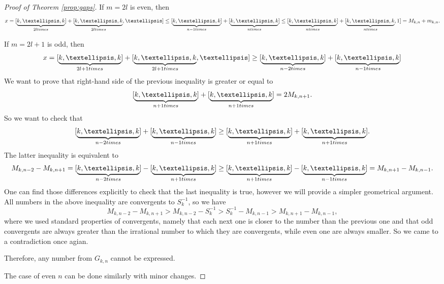\documentclass{amsart}
\theoremstyle{definition}
\newtheorem{conjecture}[theorem]{Conjecture}
\newcommand{\0}{\mbf 0}%
\renewcommand{\text}{\textup}
\begin{document}
\begin{proof}[Proof of Theorem \ref{prop:gaps}]
If $m=2l$ is even, then
$$
x = [\underbrace{k,\ldots,k}_{2l \text{ times }}] + [\underbrace{k,\ldots,k}_{2l \text{ times }},\ldots] \leq [\underbrace{k,\ldots,k}_{n-1 \text{ times }}] + [\underbrace{k,\ldots,k}_{n \text{ times }}] \leq [\underbrace{k,\ldots,k}_{n \text{ times }}] + [\underbrace{k,\ldots,k}_{n \text{ times }},1] = M_{k,n}+m_{k,n}.
$$

If $m=2l+1$ is odd, then 
$$
x = [\underbrace{k,\ldots,k}_{2l+1 \text{ times }}] + [\underbrace{k,\ldots,k}_{2l+1 \text{ times }},\ldots] \geq [\underbrace{k,\ldots,k}_{n-2 \text{ times }}] + [\underbrace{k,\ldots,k}_{n-1 \text{ times }}]
$$
We want to prove that right-hand side of the previous inequality is greater or equal to  
$$ [\underbrace{k,\ldots,k}_{n+1 \text{ times }}] + [\underbrace{k,\ldots,k}_{n+1 \text{ times }}] = 2M_{k,n+1}.
$$
So we want to check that
$$
[\underbrace{k,\ldots,k}_{n-2 \text{ times }}] + [\underbrace{k,\ldots,k}_{n-1 \text{ times }}] \geq [\underbrace{k,\ldots,k}_{n+1 \text{ times }}] + [\underbrace{k,\ldots,k}_{n+1 \text{ times }}].
$$
The latter inequality is equivalent to
$$
M_{k,n-2}-M_{k,n+1}=[\underbrace{k,\ldots,k}_{n-2 \text{ times }}] -[\underbrace{k,\ldots,k}_{n+1 \text{ times }}]  \geq [\underbrace{k,\ldots,k}_{n+1 \text{ times }}] - [\underbrace{k,\ldots,k}_{n-1 \text{ times }}] =M_{k,n+1}-M_{k,n-1}.
$$
One can find those differences explicitly to check that the last inequality is true, however we will provide a simpler geometrical argument. All numbers in the above inequality are convergents to $S_k^{-1}$, so we have
$$
M_{k,n-2}-M_{k,n+1} > M_{k,n-2}- S_k^{-1} >S_k^{-1} - M_{k,n-1} >  M_{k,n+1}-M_{k,n-1},
$$
where we used standard properties of convergents, namely that each next one is closer to the number than the previous one and that odd convergents are always greater than the irrational number to which they are convergents, while even one are always smaller. So we came to a contradiction once agian.

Therefore, any number from $G_{k,n}$ cannot be expressed.

The case of even $n$ can be done similarly with minor changes.

\end{proof}

\end{document}
